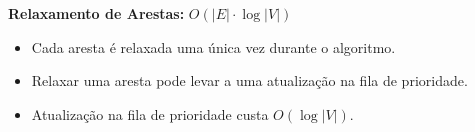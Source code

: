 \documentclass[preview]{standalone}
\begin{document}
\begin{center}
\textbf{Relaxamento de Arestas:} $O(|E| \cdot \log |V|)$
            \begin{itemize}
                \item Cada aresta é relaxada uma única vez durante o algoritmo.
                \item Relaxar uma aresta pode levar a uma atualização na fila de prioridade.
                \item Atualização na fila de prioridade custa $O(\log |V|)$.
            \end{itemize}
\end{center}
\end{document}
